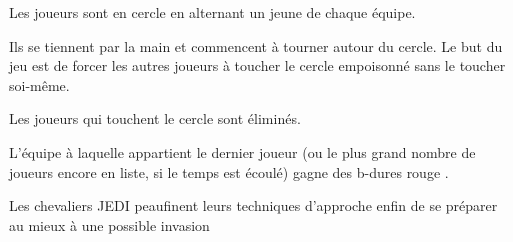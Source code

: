 \documentclass{grand-jeu}
\begin{document}
\begin{liste-materiel}
\end{liste-materiel}

\begin{regles}
Les joueurs sont en cercle en alternant un jeune de chaque équipe.

Ils se tiennent par la main et commencent à tourner autour du cercle. Le but du jeu est de forcer les autres joueurs à toucher le cercle empoisonné sans le toucher soi-même. 

Les joueurs qui touchent le cercle sont éliminés.

L'équipe à laquelle appartient le dernier joueur (ou le plus grand nombre de joueurs encore en liste, si le temps est écoulé) gagne des b-dures rouge .
\end{regles}

\begin{imaginaire} 
Les chevaliers JEDI peaufinent leurs techniques d'approche enfin de se préparer au mieux à une possible invasion 
\end{imaginaire}

\begin{moments-stop}
\end{moments-stop}
\end{document}
